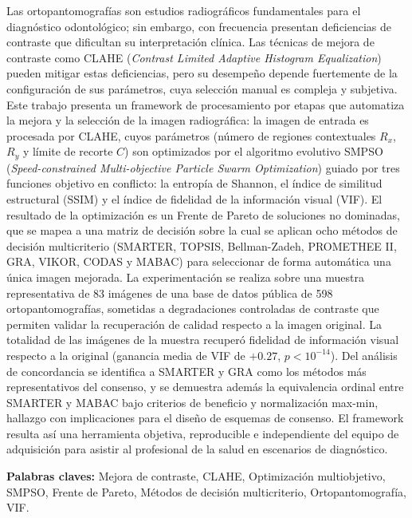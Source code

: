 \documentclass[12pt, a4paper, oneside]{Thesis}
\begin{document}
Las ortopantomografías son estudios radiográficos fundamentales para el diagnóstico odontológico; sin embargo, con frecuencia presentan deficiencias de contraste que dificultan su interpretación clínica. Las técnicas de mejora de contraste como CLAHE (\textit{Contrast Limited Adaptive Histogram Equalization}) pueden mitigar estas deficiencias, pero su desempeño depende fuertemente de la configuración de sus parámetros, cuya selección manual es compleja y subjetiva. Este trabajo presenta un framework de procesamiento por etapas que automatiza la mejora y la selección de la imagen radiográfica: la imagen de entrada es procesada por CLAHE, cuyos parámetros (número de regiones contextuales $R_x$, $R_y$ y límite de recorte $C$) son optimizados por el algoritmo evolutivo SMPSO (\textit{Speed-constrained Multi-objective Particle Swarm Optimization}) guiado por tres funciones objetivo en conflicto: la entropía de Shannon, el índice de similitud estructural (SSIM) y el índice de fidelidad de la información visual (VIF). El resultado de la optimización es un Frente de Pareto de soluciones no dominadas, que se mapea a una matriz de decisión sobre la cual se aplican ocho métodos de decisión multicriterio (SMARTER, TOPSIS, Bellman-Zadeh, PROMETHEE II, GRA, VIKOR, CODAS y MABAC) para seleccionar de forma automática una única imagen mejorada. La experimentación se realiza sobre una muestra representativa de 83 imágenes de una base de datos pública de 598 ortopantomografías, sometidas a degradaciones controladas de contraste que permiten validar la recuperación de calidad respecto a la imagen original. La totalidad de las imágenes de la muestra recuperó fidelidad de información visual respecto a la original (ganancia media de VIF de $+0.27$, $p < 10^{-14}$). Del análisis de concordancia se identifica a SMARTER y GRA como los métodos más representativos del consenso, y se demuestra además la equivalencia ordinal entre SMARTER y MABAC bajo criterios de beneficio y normalización max-min, hallazgo con implicaciones para el diseño de esquemas de consenso. El framework resulta así una herramienta objetiva, reproducible e independiente del equipo de adquisición para asistir al profesional de la salud en escenarios de diagnóstico.

\textbf{Palabras claves:} Mejora de contraste, CLAHE, Optimización multiobjetivo, SMPSO, Frente de Pareto, Métodos de decisión multicriterio, Ortopantomografía, VIF.
\clearpage \newpage

\end{document}
